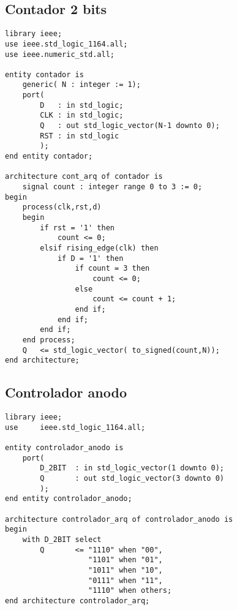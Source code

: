 \documentclass[10pt,a4paper]{article}
\begin{document}
\subsection*{Contador 2 bits}
\begin{center}
\begin{verbatim}
library ieee;
use ieee.std_logic_1164.all;
use ieee.numeric_std.all;

entity contador is
    generic( N : integer := 1);
    port(
        D   : in std_logic;
        CLK : in std_logic;
        Q   : out std_logic_vector(N-1 downto 0);
        RST : in std_logic
        );
end entity contador;

architecture cont_arq of contador is
    signal count : integer range 0 to 3 := 0;
begin
    process(clk,rst,d)
    begin
        if rst = '1' then
            count <= 0;
        elsif rising_edge(clk) then
            if D = '1' then
                if count = 3 then
                    count <= 0;
                else
                    count <= count + 1;
                end if;
            end if;
        end if;
    end process;
    Q   <= std_logic_vector( to_signed(count,N));
end architecture;
\end{verbatim}
\end{center}
\subsection{Controlador anodo}
\begin{center}
\begin{verbatim}
library ieee;
use     ieee.std_logic_1164.all;

entity controlador_anodo is
    port(
        D_2BIT  : in std_logic_vector(1 downto 0);
        Q       : out std_logic_vector(3 downto 0)
        );
end entity controlador_anodo;

architecture controlador_arq of controlador_anodo is
begin
    with D_2BIT select
        Q       <= "1110" when "00",
                   "1101" when "01",
                   "1011" when "10",
                   "0111" when "11",
                   "1110" when others;
end architecture controlador_arq;
\end{verbatim}
\end{center}
\end{document}
